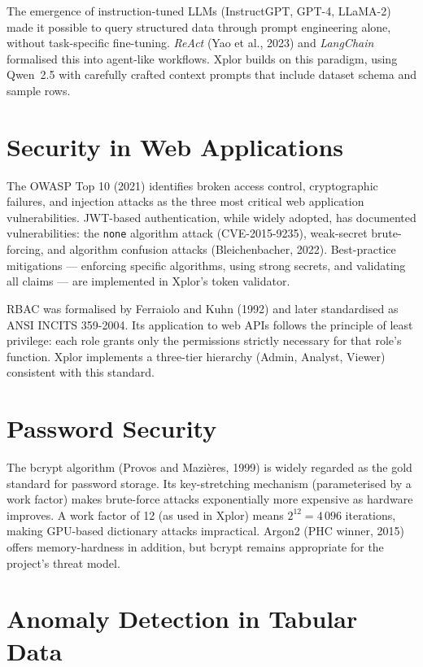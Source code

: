 \documentclass[12pt,a4paper]{report}
\begin{document}
The emergence of instruction-tuned LLMs (InstructGPT, GPT-4, LLaMA-2) made it possible to query structured data through prompt engineering alone, without task-specific fine-tuning. \textit{ReAct} (Yao et al., 2023) and \textit{LangChain} formalised this into agent-like workflows. Xplor builds on this paradigm, using Qwen~2.5 with carefully crafted context prompts that include dataset schema and sample rows.

\section{Security in Web Applications}

The OWASP Top 10 (2021) identifies broken access control, cryptographic failures, and injection attacks as the three most critical web application vulnerabilities. JWT-based authentication, while widely adopted, has documented vulnerabilities: the \texttt{none} algorithm attack (CVE-2015-9235), weak-secret brute-forcing, and algorithm confusion attacks (Bleichenbacher, 2022). Best-practice mitigations — enforcing specific algorithms, using strong secrets, and validating all claims — are implemented in Xplor's token validator.

RBAC was formalised by Ferraiolo and Kuhn (1992) and later standardised as ANSI INCITS 359-2004. Its application to web APIs follows the principle of least privilege: each role grants only the permissions strictly necessary for that role's function. Xplor implements a three-tier hierarchy (Admin, Analyst, Viewer) consistent with this standard.

\section{Password Security}

The bcrypt algorithm (Provos and Mazières, 1999) is widely regarded as the gold standard for password storage. Its key-stretching mechanism (parameterised by a work factor) makes brute-force attacks exponentially more expensive as hardware improves. A work factor of 12 (as used in Xplor) means $2^{12} = 4\,096$ iterations, making GPU-based dictionary attacks impractical. Argon2 (PHC winner, 2015) offers memory-hardness in addition, but bcrypt remains appropriate for the project's threat model.

\section{Anomaly Detection in Tabular Data}
\end{document}
